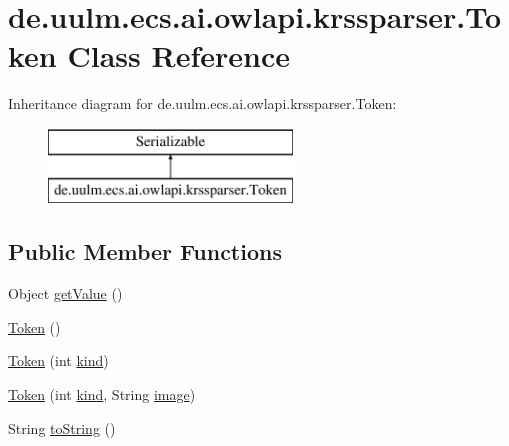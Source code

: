 \hypertarget{classde_1_1uulm_1_1ecs_1_1ai_1_1owlapi_1_1krssparser_1_1_token}{\section{de.\-uulm.\-ecs.\-ai.\-owlapi.\-krssparser.\-Token Class Reference}
\label{classde_1_1uulm_1_1ecs_1_1ai_1_1owlapi_1_1krssparser_1_1_token}
}
Inheritance diagram for de.\-uulm.\-ecs.\-ai.\-owlapi.\-krssparser.\-Token\-:\begin{figure}[H]
\begin{center}
\leavevmode
\includegraphics[height=2.000000cm]{classde_1_1uulm_1_1ecs_1_1ai_1_1owlapi_1_1krssparser_1_1_token}
\end{center}
\end{figure}
\subsection*{Public Member Functions}
\begin{DoxyCompactItemize}
\item 
Object \hyperlink{classde_1_1uulm_1_1ecs_1_1ai_1_1owlapi_1_1krssparser_1_1_token_a1a2e9691d69a20d717dfd754fa8bf52a}{get\-Value} ()
\item 
\hyperlink{classde_1_1uulm_1_1ecs_1_1ai_1_1owlapi_1_1krssparser_1_1_token_adc5e2180ed8388dd9753b39a1ad7d70d}{Token} ()
\item 
\hyperlink{classde_1_1uulm_1_1ecs_1_1ai_1_1owlapi_1_1krssparser_1_1_token_af8d4618411ecc8ef7dad4755acdd64b6}{Token} (int \hyperlink{classde_1_1uulm_1_1ecs_1_1ai_1_1owlapi_1_1krssparser_1_1_token_a3d269fe5bd08d8050c8095c2fc6c8c75}{kind})
\item 
\hyperlink{classde_1_1uulm_1_1ecs_1_1ai_1_1owlapi_1_1krssparser_1_1_token_a1d3f28ff84979bf814de47fe769a005e}{Token} (int \hyperlink{classde_1_1uulm_1_1ecs_1_1ai_1_1owlapi_1_1krssparser_1_1_token_a3d269fe5bd08d8050c8095c2fc6c8c75}{kind}, String \hyperlink{classde_1_1uulm_1_1ecs_1_1ai_1_1owlapi_1_1krssparser_1_1_token_a2541ddc96638a6587e775f3237c58c26}{image})
\item 
String \hyperlink{classde_1_1uulm_1_1ecs_1_1ai_1_1owlapi_1_1krssparser_1_1_token_a6a4f2bbb62c39f25867734e619a1623e}{to\-String} ()
\end{DoxyCompactItemize}

